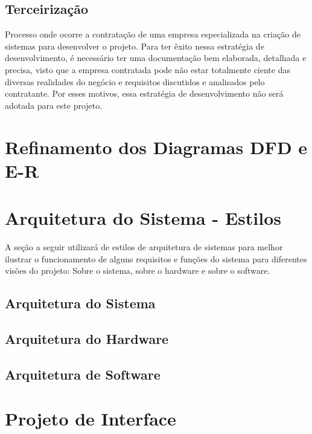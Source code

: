 		\subsection{Terceirização}
			Processo onde ocorre a contratação de uma empresa especializada na criação de sistemas para desenvolver o projeto. 
			Para ter êxito nessa estratégia de desenvolvimento, é necessário ter uma documentação bem elaborada, detalhada e precisa, visto que a empresa contratada pode não estar totalmente ciente das diversas realidades do negócio e requisitos discutidos e analisados pelo contratante. Por esses motivos, essa estratégia de desenvolvimento não será adotada para este projeto.
						

\section{Refinamento dos Diagramas DFD e E-R}


\section{Arquitetura do Sistema - Estilos}
	A seção a seguir utilizará de estilos de arquitetura de sistemas para melhor ilustrar o funcionamento de alguns requisitos e funções do sistema para diferentes visões do projeto: Sobre o sistema, sobre o hardware e sobre o software. 
	

    \subsection{Arquitetura do Sistema}

		

    \subsection{Arquitetura do Hardware}


    \subsection{Arquitetura de Software}


\section{Projeto de Interface}


